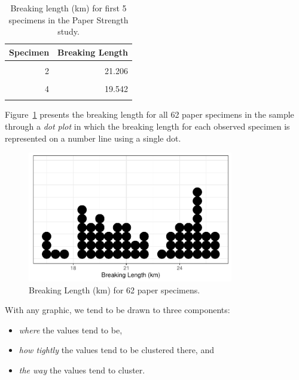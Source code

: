 \documentclass[
  letterpaper,
  DIV=11,
  numbers=noendperiod]{scrreprt}
\providecommand{\tightlist}{%
  \setlength{\itemsep}{0pt}\setlength{\parskip}{0pt}}\usepackage{longtable,booktabs,array}
\theoremstyle{plain}
\theoremstyle{definition}
\theoremstyle{definition}
\theoremstyle{remark}
\begin{document}
\hypertarget{tbl-summaries-paper-table}{}
\begin{table}
\caption{\label{tbl-summaries-paper-table}Breaking length (km) for first 5 specimens in the Paper Strength study. }\tabularnewline

\centering
\begin{tabular}[t]{rr}
\toprule
Specimen & Breaking Length\\
\midrule
\cellcolor{gray!6}{1} & \cellcolor{gray!6}{21.312}\\
2 & 21.206\\
\cellcolor{gray!6}{3} & \cellcolor{gray!6}{20.709}\\
4 & 19.542\\
\cellcolor{gray!6}{5} & \cellcolor{gray!6}{20.449}\\
\bottomrule
\end{tabular}
\end{table}

Figure~\ref{fig-summaries-paper-dotplot} presents the breaking length
for all 62 paper specimens in the sample through a \emph{dot plot} in
which the breaking length for each observed specimen is represented on a
number line using a single dot.

\begin{figure}

{\centering \includegraphics[width=0.8\textwidth,height=\textheight]{./images/fig-summaries-paper-dotplot-1.pdf}

}

\caption{\label{fig-summaries-paper-dotplot}Breaking Length (km) for 62
paper specimens.}

\end{figure}

With any graphic, we tend to be drawn to three components:

\begin{itemize}
\tightlist
\item
  \emph{where} the values tend to be,
\item
  \emph{how tightly} the values tend to be clustered there, and
\item
  \emph{the way} the values tend to cluster.
\end{itemize}
\end{document}

